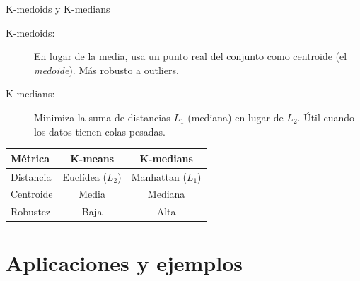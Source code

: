 \documentclass[aspectratio=169]{beamer}
\begin{document}
\begin{frame}{K-medoids y K-medians}
    \begin{description}
        \item[K-medoids:] En lugar de la media, usa un punto real del conjunto como centroide (el \textit{medoide}). Más robusto a outliers.
        
        \item[K-medians:] Minimiza la suma de distancias \(L_1\) (mediana) en lugar de \(L_2\). Útil cuando los datos tienen colas pesadas.
    \end{description}
    
    \begin{table}
        \centering
        \begin{tabular}{|l|c|c|}
            \hline
            \textbf{Métrica} & \textbf{K-means} & \textbf{K-medians} \\
            \hline
            Distancia & Euclídea (\(L_2\)) & Manhattan (\(L_1\)) \\
            Centroide & Media & Mediana \\
            Robustez & Baja & Alta \\
            \hline
        \end{tabular}
    \end{table}
\end{frame}

\section{Aplicaciones y ejemplos}
\end{document}
